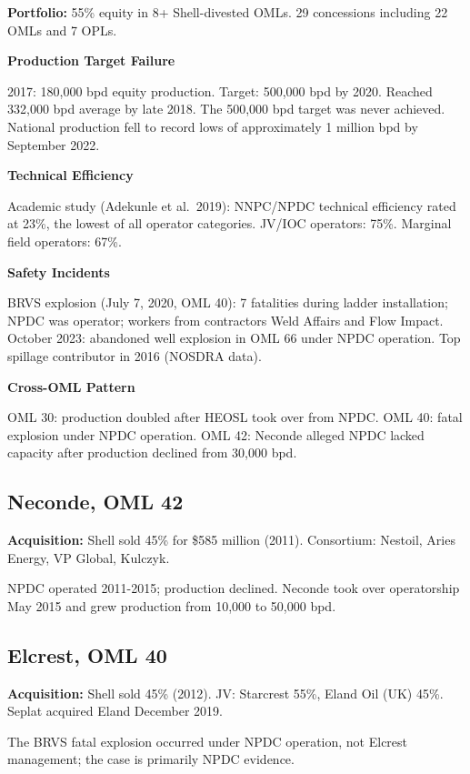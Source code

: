 \documentclass[twoside,fontset=lmodern]{mitthesis}
\begin{document}
\textbf{Portfolio:} 55\% equity in 8+ Shell-divested OMLs. 29
concessions including 22 OMLs and 7 OPLs.

\textbf{Production Target Failure}

2017: 180,000 bpd equity production. Target: 500,000 bpd by 2020.
Reached 332,000 bpd average by late 2018. The 500,000 bpd target was
never achieved. National production fell to record lows of approximately
1 million bpd by September 2022.

\textbf{Technical Efficiency}

Academic study (Adekunle et al.~2019): NNPC/NPDC technical efficiency
rated at 23\%, the lowest of all operator categories. JV/IOC operators:
75\%. Marginal field operators: 67\%.

\textbf{Safety Incidents}

BRVS explosion (July 7, 2020, OML 40): 7 fatalities during ladder
installation; NPDC was operator; workers from contractors Weld Affairs
and Flow Impact. October 2023: abandoned well explosion in OML 66 under
NPDC operation. Top spillage contributor in 2016 (NOSDRA data).

\textbf{Cross-OML Pattern}

OML 30: production doubled after HEOSL took over from NPDC. OML 40:
fatal explosion under NPDC operation. OML 42: Neconde alleged NPDC
lacked capacity after production declined from 30,000 bpd.

\hypertarget{neconde-oml-42}{%
\subsection{Neconde, OML 42}\label{neconde-oml-42}}

\textbf{Acquisition:} Shell sold 45\% for \$585 million (2011).
Consortium: Nestoil, Aries Energy, VP Global, Kulczyk.

NPDC operated 2011-2015; production declined. Neconde took over
operatorship May 2015 and grew production from 10,000 to 50,000 bpd.

\hypertarget{elcrest-oml-40}{%
\subsection{Elcrest, OML 40}\label{elcrest-oml-40}}

\textbf{Acquisition:} Shell sold 45\% (2012). JV: Starcrest 55\%, Eland
Oil (UK) 45\%. Seplat acquired Eland December 2019.

The BRVS fatal explosion occurred under NPDC operation, not Elcrest
management; the case is primarily NPDC evidence.
\end{document}
